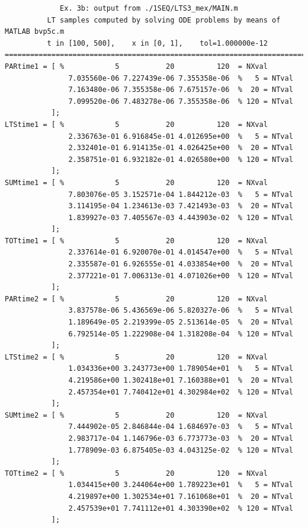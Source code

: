 \documentclass[a4paper,10pt]{report}%
\begin{document}
\begin{lstlisting}
             Ex. 3b: output from ./1SEQ/LTS3_mex/MAIN.m
          LT samples computed by solving ODE problems by means of MATLAB bvp5c.m
          t in [100, 500],    x in [0, 1],    tol=1.000000e-12
====================================================================================
PARtime1 = [ %            5           20          120  = NXval
               7.035560e-06 7.227439e-06 7.355358e-06  %   5 = NTval
               7.163480e-06 7.355358e-06 7.675157e-06  %  20 = NTval
               7.099520e-06 7.483278e-06 7.355358e-06  % 120 = NTval
           ];
LTStime1 = [ %            5           20          120  = NXval
               2.336763e-01 6.916845e-01 4.012695e+00  %   5 = NTval
               2.332401e-01 6.914135e-01 4.026425e+00  %  20 = NTval
               2.358751e-01 6.932182e-01 4.026580e+00  % 120 = NTval
           ];
SUMtime1 = [ %            5           20          120  = NXval
               7.803076e-05 3.152571e-04 1.844212e-03  %   5 = NTval
               3.114195e-04 1.234613e-03 7.421493e-03  %  20 = NTval
               1.839927e-03 7.405567e-03 4.443903e-02  % 120 = NTval
           ];
TOTtime1 = [ %            5           20          120  = NXval
               2.337614e-01 6.920070e-01 4.014547e+00  %   5 = NTval
               2.335587e-01 6.926555e-01 4.033854e+00  %  20 = NTval
               2.377221e-01 7.006313e-01 4.071026e+00  % 120 = NTval
           ];
PARtime2 = [ %            5           20          120  = NXval
               3.837578e-06 5.436569e-06 5.820327e-06  %   5 = NTval
               1.189649e-05 2.219399e-05 2.513614e-05  %  20 = NTval
               6.792514e-05 1.222908e-04 1.318208e-04  % 120 = NTval
           ];
LTStime2 = [ %            5           20          120  = NXval
               1.034336e+00 3.243773e+00 1.789054e+01  %   5 = NTval
               4.219586e+00 1.302418e+01 7.160388e+01  %  20 = NTval
               2.457354e+01 7.740412e+01 4.302984e+02  % 120 = NTval
           ];
SUMtime2 = [ %            5           20          120  = NXval
               7.444902e-05 2.846844e-04 1.684697e-03  %   5 = NTval
               2.983717e-04 1.146796e-03 6.773773e-03  %  20 = NTval
               1.778909e-03 6.875405e-03 4.043125e-02  % 120 = NTval
           ];
TOTtime2 = [ %            5           20          120  = NXval
               1.034415e+00 3.244064e+00 1.789223e+01  %   5 = NTval
               4.219897e+00 1.302534e+01 7.161068e+01  %  20 = NTval
               2.457539e+01 7.741112e+01 4.303390e+02  % 120 = NTval
           ];
\end{lstlisting}
\end{document}
